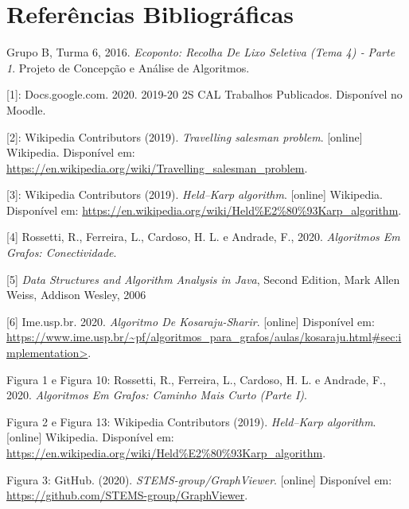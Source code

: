 \documentclass[article, a4paper, 12pt, oneside]{memoir}
\begin{document}
\chapter[Referências Bibliográficas][Referências Bibliográficas]{Referências Bibliográficas} \label{\thechapter}
Grupo B, Turma 6, 2016. \textit{Ecoponto: Recolha De Lixo Seletiva (Tema 4) ‐ Parte 1}. Projeto de Concepção e Análise de Algoritmos.

[1]: Docs.google.com. 2020. 2019-20 2S CAL Trabalhos Publicados. Disponível no Moodle.

[2]: Wikipedia Contributors (2019). \textit{Travelling salesman problem}. [online] Wikipedia. Disponível em: \url{https://en.wikipedia.org/wiki/Travelling_salesman_problem}.

[3]: Wikipedia Contributors (2019). \textit{Held–Karp algorithm}. [online] Wikipedia. Disponível em: \url{https://en.wikipedia.org/wiki/Held%E2%80%93Karp_algorithm}.

[4] Rossetti, R., Ferreira, L., Cardoso, H. L. e Andrade, F., 2020. \textit{Algoritmos Em Grafos: Conectividade}.

[5] \textit{Data Structures and Algorithm Analysis in Java}, Second
Edition, Mark Allen Weiss, Addison Wesley, 2006 

[6] Ime.usp.br. 2020. \textit{Algoritmo De Kosaraju-Sharir}. [online] Disponível em: \url{https://www.ime.usp.br/~pf/algoritmos_para_grafos/aulas/kosaraju.html#sec:implementation>}.

Figura 1 e Figura 10: Rossetti, R., Ferreira, L., Cardoso, H. L. e Andrade, F., 2020. \textit{Algoritmos Em Grafos: Caminho Mais Curto (Parte I)}.

Figura 2 e Figura 13: Wikipedia Contributors (2019). \textit{Held–Karp algorithm}. [online] Wikipedia. Disponível em: \url{https://en.wikipedia.org/wiki/Held%E2%80%93Karp_algorithm}.

Figura 3: GitHub. (2020). \textit{STEMS-group/GraphViewer}. [online] Disponível em: \url{https://github.com/STEMS-group/GraphViewer}.

‌

‌

\newpage
\end{document}
